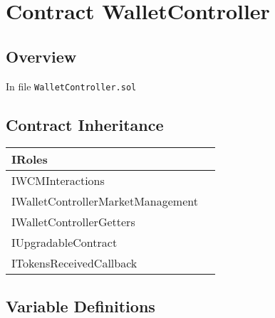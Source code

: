 
\chapter{Contract WalletController}

\minitoc

\section{Overview}


In file {\tt WalletController.sol}

\section{Contract Inheritance}


\noindent\begin{tabular}{|l|p{5cm}|}\hline
IRoles & \\\hline
IWCMInteractions & \\\hline
IWalletControllerMarketManagement & \\\hline
IWalletControllerGetters & \\\hline
IUpgradableContract & \\\hline
ITokensReceivedCallback & \\\hline
\end{tabular}


\section{Variable Definitions}


